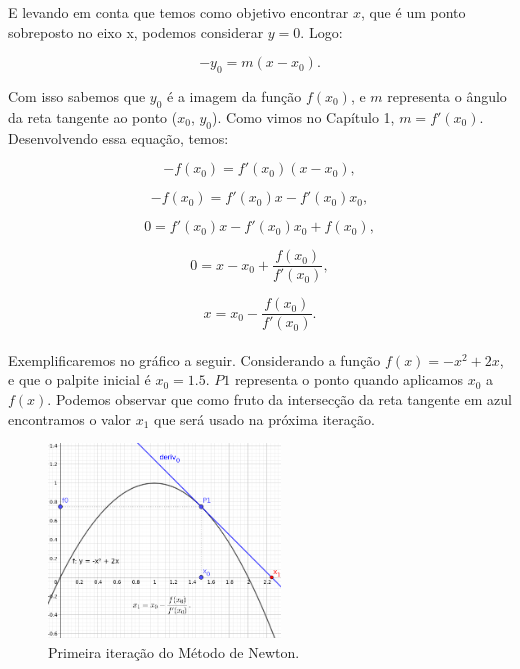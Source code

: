 E levando em conta que temos como objetivo encontrar $x$, que é um ponto
sobreposto no eixo x, podemos considerar $y=0$. Logo:

\begin{equation}
    -y_0=m(x-x_0).
\end{equation}

Com isso sabemos que $y_0$ é a imagem da função $f(x_0)$, e $m$ representa o
ângulo da reta tangente ao ponto ($x_0$, $y_0$). Como vimos no Capítulo 1,
 $m=f'(x_0)$. Desenvolvendo essa equação, temos:

\begin{equation}
    -f(x_0) = f'(x_0)(x-x_0),
\end{equation}

\begin{equation}
    -f(x_0) = f'(x_0)x - f'(x_0)x_0,
\end{equation}

\begin{equation}
    0 = f'(x_0)x - f'(x_0)x_0+f(x_0),
\end{equation}

\begin{equation}
    0 = x - x_0 + \frac{f(x_0)}{f'(x_0)},
\end{equation}

\begin{equation}
    x = x_0 - \frac {f(x_0)}{f'(x_0)}.
\end{equation}\\

Exemplificaremos no gráfico a seguir. Considerando a função $f(x)=-x^2+2x$, e
que o palpite inicial é $x_0=1.5$. $P1$ representa o ponto quando aplicamos
$x_0$ a $f(x)$. Podemos observar que como fruto da intersecção da reta tangente em azul
encontramos o valor $x_1$ que será usado na próxima iteração.

\begin{figure}[ht]
    \includegraphics[width=0.55\textwidth]
      {src/MetodoNewton_grafico_1.png}
    \centering
    \caption{
      Primeira iteração do Método de Newton.
     }
    \label{MetodoNewton_grafico_1}
\end{figure}


